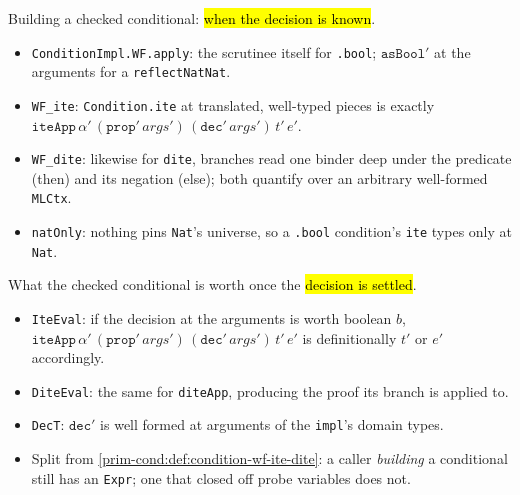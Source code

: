 \begin{definition}
  \label{prim-cond:def:condition-wf-ite-dite}
  \leanok

   Building a checked conditional: \hl{when the decision is known}.
  \begin{itemize}
  \item \texttt{ConditionImpl.WF.apply}: the scrutinee itself for \texttt{.bool}; $\mathtt{asBool}'$
    at the arguments for a \texttt{reflectNatNat}.
  \item \texttt{WF\_ite}: \texttt{Condition.ite} at translated, well-typed pieces is exactly
    $\mathtt{iteApp}\,\alpha'\,(\mathtt{prop}'\,\mathit{args}')\,(\mathtt{dec}'\,\mathit{args}')\,t'\,e'$.
  \item \texttt{WF\_dite}: likewise for \texttt{dite}, branches read one binder deep under the
    predicate (then) and its negation (else); both quantify over an arbitrary well-formed
    \texttt{MLCtx}.
  \item {} \texttt{natOnly}: nothing pins \texttt{Nat}'s universe, so a \texttt{.bool}
    condition's \texttt{ite} types only at \texttt{Nat}.
  \end{itemize}
\end{definition}

\begin{definition}
  \label{prim-cond:def:condition-wf-eval}
  \leanok

   What the checked conditional is worth once the \hl{decision is settled}.
  \begin{itemize}
  \item \texttt{IteEval}: if the decision at the arguments is worth boolean $b$, $\mathtt{iteApp}\,\alpha'\,(\mathtt{prop}'\,\mathit{args}')\,(\mathtt{dec}'\,\mathit{args}')\,t'\,e'$ is
    definitionally $t'$ or $e'$ accordingly.
  \item \texttt{DiteEval}: the same for \texttt{diteApp}, producing the proof its branch is
    applied to.
  \item \texttt{DecT}: $\mathtt{dec}'$ is well formed at arguments of the \texttt{impl}'s domain
    types.
  \item Split from \ref{prim-cond:def:condition-wf-ite-dite}: a caller \emph{building} a
    conditional still has an \texttt{Expr}; one that closed off probe variables does not.
  \end{itemize}
\end{definition}

